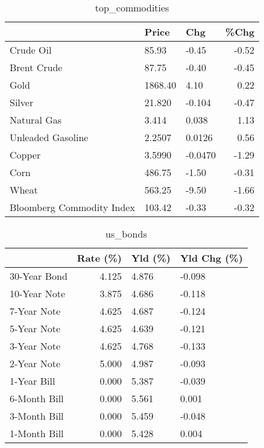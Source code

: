 \documentclass{article}%
\begin{document}
\begin{table}[htbp]%
\caption{top\_commodities}%
\centering%
\begin{adjustbox}{width=1\textwidth}%
\begin{tabular}{lllr}
\toprule
                          &   Price &     Chg &  \%Chg \\
\midrule
               Crude Oil  &   85.93 &   -0.45 & -0.52 \\
             Brent Crude  &   87.75 &   -0.40 & -0.45 \\
                    Gold  & 1868.40 &    4.10 &  0.22 \\
                  Silver  &  21.820 &  -0.104 & -0.47 \\
             Natural Gas  &   3.414 &   0.038 &  1.13 \\
       Unleaded Gasoline  &  2.2507 &  0.0126 &  0.56 \\
                  Copper  &  3.5990 & -0.0470 & -1.29 \\
                    Corn  &  486.75 &   -1.50 & -0.31 \\
                   Wheat  &  563.25 &   -9.50 & -1.66 \\
Bloomberg Commodity Index &  103.42 &   -0.33 & -0.32 \\
\bottomrule
\end{tabular}
%
\end{adjustbox}%
\end{table}

%


\begin{table}[htbp]%
\caption{us\_bonds}%
\centering%
\begin{adjustbox}{width=1\textwidth}%
\begin{tabular}{lrll}
\toprule
             &  Rate (\%) & Yld (\%) & Yld Chg (\%) \\
\midrule
30-Year Bond &     4.125 &   4.876 &      -0.098 \\
10-Year Note &     3.875 &   4.686 &      -0.118 \\
 7-Year Note &     4.625 &   4.687 &      -0.124 \\
 5-Year Note &     4.625 &   4.639 &      -0.121 \\
 3-Year Note &     4.625 &   4.768 &      -0.133 \\
 2-Year Note &     5.000 &   4.987 &      -0.093 \\
 1-Year Bill &     0.000 &   5.387 &      -0.039 \\
6-Month Bill &     0.000 &   5.561 &       0.001 \\
3-Month Bill &     0.000 &   5.459 &      -0.048 \\
1-Month Bill &     0.000 &   5.428 &       0.004 \\
\bottomrule
\end{tabular}
%
\end{adjustbox}%
\end{table}
\end{document}
